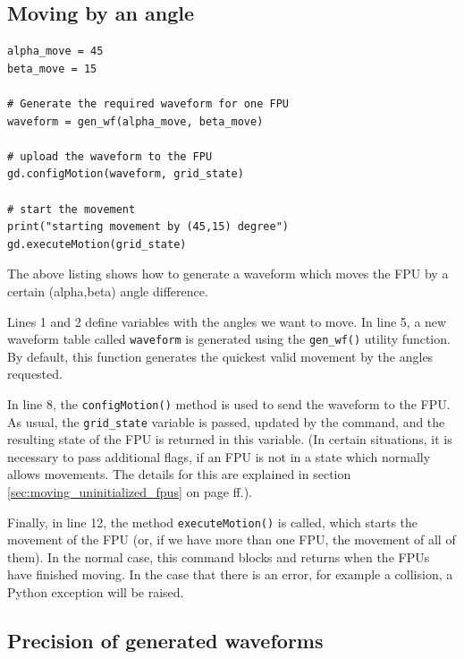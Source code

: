 \documentclass[fontsize=12,a4paper]{scrreprt}
\begin{document}
\subsection{Moving by an angle}
\begin{verbatim}
alpha_move = 45
beta_move = 15

# Generate the required waveform for one FPU
waveform = gen_wf(alpha_move, beta_move)

# upload the waveform to the FPU
gd.configMotion(waveform, grid_state)

# start the movement
print("starting movement by (45,15) degree")
gd.executeMotion(grid_state)
\end{verbatim}

The above listing shows how to generate a waveform which moves the FPU
by a certain (alpha,beta) angle difference.

Lines 1 and 2 define variables with the angles we want to move. In
line 5, a new waveform table called \texttt{waveform} is generated
using the \texttt{gen\_wf()} utility function.  By default, this
function generates the quickest valid movement by the angles
requested.

In line 8, the \texttt{configMotion()} method is used to send the
waveform to the FPU. As usual, the \texttt{grid\_state} variable is
passed, updated by the command, and the resulting state of the FPU is
returned in this variable. (In certain situations, it is necessary to
pass additional flags, if an FPU is not in a state which normally
allows movements. The details for this are explained in section
\ref{sec:moving_uninitialized_fpus} on page
\pageref{sec:moving_uninitialized_fpus} ff.).

Finally, in line 12, the method \texttt{executeMotion()} is called,
which starts the movement of the FPU (or, if we have more than one
FPU, the movement of all of them). In the normal case, this command
blocks and returns when the FPUs have finished moving.  In the case
that there is an error, for example a collision, a Python exception
will be raised.

\subsection{Precision of generated waveforms}
\end{document}
